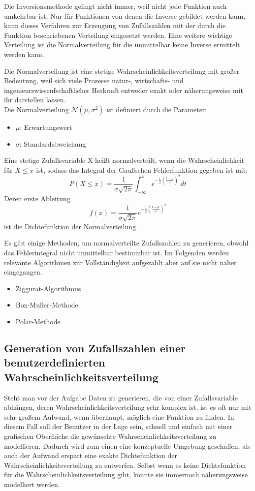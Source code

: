 Die Inversionsmethode gelingt nicht immer, weil nicht jede Funktion auch umkehrbar ist. Nur für Funktionen von denen die Inverse gebildet werden kann, kann dieses Verfahren zur Erzeugung von Zufallszahlen mit der durch die Funktion beschriebenen Verteilung eingesetzt werden. Eine weitere wichtige Verteilung ist die Normalverteilung für die unmittelbar keine Inverse ermittelt werden kann. 

Die Normalverteilung ist eine stetige Wahrscheinlichkeitsverteilung mit großer Bedeutung, weil sich viele Prozesse natur-, wirtschafts- und ingenieurswissenfschaftlicher Herkunft entweder exakt oder näherungsweise mit ihr darstellen lassen.\\ 
Die Normalverteilung $\mathcal{N}(\mu,\sigma ^2)$ ist definiert durch die Parameter: 
\begin{itemize}
    \item $\mu$: Erwartungswert
    \item $\sigma$: Standardabweichung
\end{itemize}
Eine stetige Zufallsvariable X heißt normalverteilt, wenn die Wahrscheinlichkeit für $X \le x$ ist, sodass das Integral der Gaußschen Fehlerfunktion gegeben ist mit:
\medskip
$$P(X \le x)=\frac{1}{\sigma\sqrt{2\pi}}\int_{-\infty}^{x}e^{-\frac{1}{2}(\frac{t-\mu}{\sigma})^2}dt$$
\medskip
Deren erste Ableitung
\medskip
$$f(x)=\frac{1}{\sigma\sqrt{2\pi}}e^{-\frac{1}{2}(\frac{t-\mu}{\sigma})^2}$$
\medskip
ist die Dichtefunktion der Normalverteilung \cite{Inversionsmethode}.

Es gibt einige Methoden, um normalverteilte Zufallszahlen zu generieren, obwohl das Fehlerintegral nicht unmittelbar bestimmbar ist. Im Folgenden werden relevante Algorithmen zur Vollständigkeit aufgezählt aber auf sie nicht näher eingegangen. 
\begin{itemize}
    \item Ziggurat-Algorithmus
    \item Box-Muller-Methode
    \item Polar-Methode
\end{itemize}

\subsection{Generation von Zufallszahlen einer benutzerdefinierten Wahrscheinlichkeitsverteilung}

Steht man vor der Aufgabe Daten zu generieren, die von einer Zufallsvariable abhängen, deren Wahrscheinlichkeitsverteilung sehr komplex ist, ist es oft nur mit sehr großem Aufwand, wenn überhaupt, möglich eine Funktion zu finden. In diesem Fall soll der Benutzer in der Lage sein, schnell und einfach mit einer grafischen Oberfläche die gewünschte Wahrscheinlichkeitsverteilung zu modellieren. Dadurch wird zum einen eine konzeptuelle Umgebung geschaffen, als auch der Aufwand erspart eine exakte Dichtefunktion der Wahrscheinlichkeitsverteilung zu entwerfen. Selbst wenn es keine Dichtefunktion für die Wahrscheinlichkeitsverteilung gibt, könnte sie immernoch näherungsweise modelliert werden.

